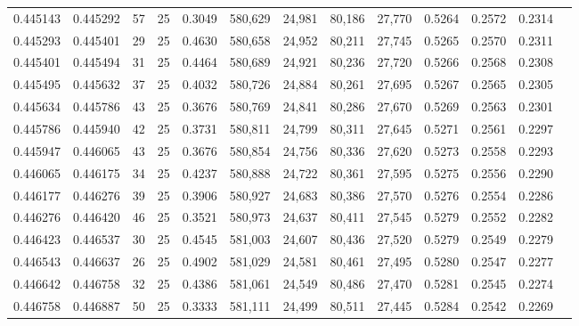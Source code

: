 \begin{tabular}{rrrrrrrrrrrrr}
0.445143 & 0.445292 &    57 &  25 &                                     0.3049 & 580,629 &  24,981 &  80,186 &  27,770 & 0.5264 & 0.2572 & 0.2314 \\
0.445293 & 0.445401 &    29 &  25 &                                     0.4630 & 580,658 &  24,952 &  80,211 &  27,745 & 0.5265 & 0.2570 & 0.2311 \\
0.445401 & 0.445494 &    31 &  25 &                                     0.4464 & 580,689 &  24,921 &  80,236 &  27,720 & 0.5266 & 0.2568 & 0.2308 \\
0.445495 & 0.445632 &    37 &  25 &                                     0.4032 & 580,726 &  24,884 &  80,261 &  27,695 & 0.5267 & 0.2565 & 0.2305 \\
0.445634 & 0.445786 &    43 &  25 &                                     0.3676 & 580,769 &  24,841 &  80,286 &  27,670 & 0.5269 & 0.2563 & 0.2301 \\
0.445786 & 0.445940 &    42 &  25 &                                     0.3731 & 580,811 &  24,799 &  80,311 &  27,645 & 0.5271 & 0.2561 & 0.2297 \\
0.445947 & 0.446065 &    43 &  25 &                                     0.3676 & 580,854 &  24,756 &  80,336 &  27,620 & 0.5273 & 0.2558 & 0.2293 \\
0.446065 & 0.446175 &    34 &  25 &                                     0.4237 & 580,888 &  24,722 &  80,361 &  27,595 & 0.5275 & 0.2556 & 0.2290 \\
0.446177 & 0.446276 &    39 &  25 &                                     0.3906 & 580,927 &  24,683 &  80,386 &  27,570 & 0.5276 & 0.2554 & 0.2286 \\
0.446276 & 0.446420 &    46 &  25 &                                     0.3521 & 580,973 &  24,637 &  80,411 &  27,545 & 0.5279 & 0.2552 & 0.2282 \\
0.446423 & 0.446537 &    30 &  25 &                                     0.4545 & 581,003 &  24,607 &  80,436 &  27,520 & 0.5279 & 0.2549 & 0.2279 \\
0.446543 & 0.446637 &    26 &  25 &                                     0.4902 & 581,029 &  24,581 &  80,461 &  27,495 & 0.5280 & 0.2547 & 0.2277 \\
0.446642 & 0.446758 &    32 &  25 &                                     0.4386 & 581,061 &  24,549 &  80,486 &  27,470 & 0.5281 & 0.2545 & 0.2274 \\
0.446758 & 0.446887 &    50 &  25 &                                     0.3333 & 581,111 &  24,499 &  80,511 &  27,445 & 0.5284 & 0.2542 & 0.2269 \\

\end{tabular}

